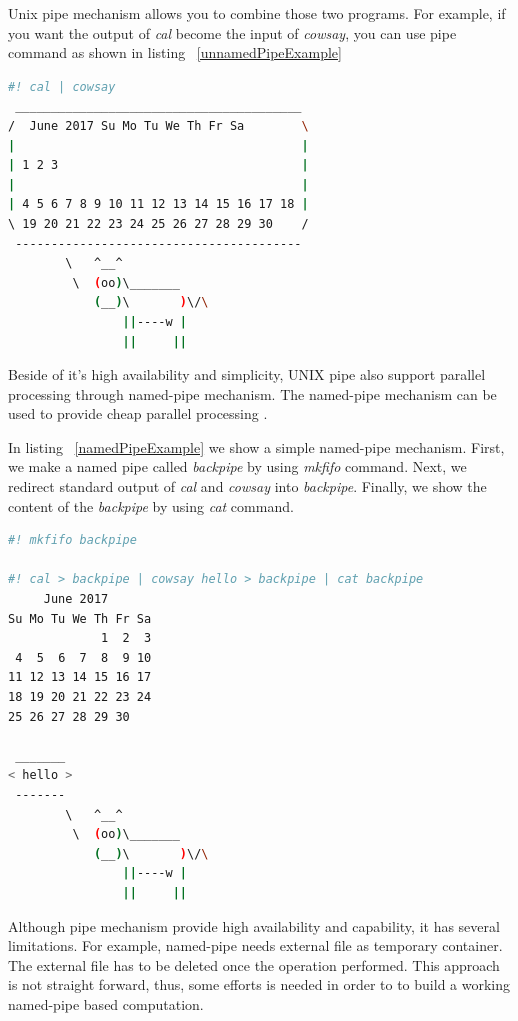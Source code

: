 \documentclass[conference]{IEEEtran}
\begin{document}
Unix pipe mechanism allows you to combine those two programs. For example, if you
want the output of {\it cal} become the input of {\it cowsay}, you can use pipe
command as shown in listing ~\ref{unnamedPipeExample}

\begin{lstlisting}[caption=Unnamed pipe example, label=unnamedPipeExample, language=bash, basicstyle=\small, breaklines=true]
#! cal | cowsay
 ________________________________________
/  June 2017 Su Mo Tu We Th Fr Sa        \
|                                        |
| 1 2 3                                  |
|                                        |
| 4 5 6 7 8 9 10 11 12 13 14 15 16 17 18 |
\ 19 20 21 22 23 24 25 26 27 28 29 30    /
 ----------------------------------------
        \   ^__^
         \  (oo)\_______
            (__)\       )\/\
                ||----w |
                ||     ||
\end{lstlisting}


Beside of it's high availability and simplicity, UNIX pipe also support parallel
processing through named-pipe mechanism. The named-pipe mechanism can be used to 
provide cheap parallel processing \cite{conway2003parallel}. 

In listing ~\ref{namedPipeExample} we show a simple named-pipe mechanism. First, we make
a named pipe called {\it backpipe} by using {\it mkfifo} command. Next, we redirect
standard output of {\it cal} and {\it cowsay} into {\it backpipe}. Finally, we show
the content of the {\it backpipe} by using {\it cat} command.

\begin{lstlisting}[caption=Named pipe example, label=namedPipeExample, language=bash, basicstyle=\small, breaklines=true]
#! mkfifo backpipe 

#! cal > backpipe | cowsay hello > backpipe | cat backpipe
     June 2017        
Su Mo Tu We Th Fr Sa  
             1  2  3  
 4  5  6  7  8  9 10  
11 12 13 14 15 16 17  
18 19 20 21 22 23 24  
25 26 27 28 29 30     
                     
 _______
< hello >
 -------
        \   ^__^
         \  (oo)\_______
            (__)\       )\/\
                ||----w |
                ||     ||
\end{lstlisting}

Although pipe mechanism provide high availability and capability, 
it has several limitations. For example, named-pipe needs external file as temporary 
container. The external file has to be deleted once the operation performed. 
This approach is not straight forward, thus, some efforts is needed in order to 
to build a working named-pipe based computation. 
\end{document}
